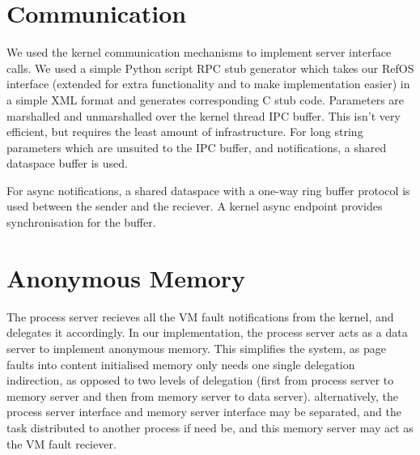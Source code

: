 \section{Communication}

We used the kernel communication mechanisms to implement server interface calls. We used a simple
Python script RPC stub generator which takes our RefOS interface (extended for extra functionality
and to make implementation easier) in a simple XML format and generates corresponding C stub code.
Parameters are marshalled and unmarshalled over the kernel thread IPC buffer. This isn't very
efficient, but requires the least amount of infrastructure. For long string parameters which 
are unsuited to the IPC buffer, and notifications, a shared dataspace buffer is used.

For async notifications, a shared dataspace with a one-way ring buffer protocol is used between the
sender and the reciever. A kernel async endpoint provides synchronisation for the buffer.


\section{Anonymous Memory}

The process server recieves all the VM fault notifications from the kernel, and delegates it
accordingly. In our implementation, the process server acts as a data server to implement anonymous
memory. This simplifies the system, as page faults into content initialised memory only needs one
single delegation indirection, as opposed to two levels of delegation (first from process server to
memory server and then from memory server to data server).  alternatively, the process server
interface and memory server interface may be separated, and the task distributed to another process
if need be, and this memory server may act as the VM fault reciever.

